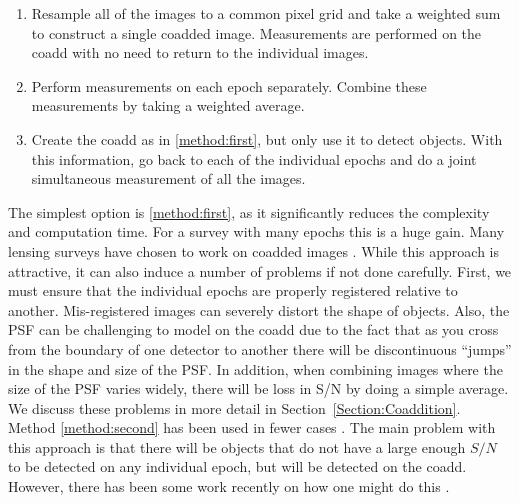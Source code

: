 \documentclass[fleqn,useAMS,usenatbib]{mnras}
\begin{document}
\begin{enumerate}
\item \label{method:first} Resample all of the images to a common pixel grid and 
take a weighted sum to construct a single coadded image.  Measurements are 
performed on the coadd with no need to return to the individual images.
\item \label{method:second} Perform measurements on each epoch separately.  
Combine these measurements by taking a weighted average.  
\item \label{method:third} Create the coadd as in \ref{method:first}, but only 
use it to detect objects.  With this information, go back to each of the 
individual epochs and do a joint simultaneous measurement of all the images.
\end{enumerate}

The simplest option is \ref{method:first}, as it significantly reduces the 
complexity and computation time.  For a survey with many epochs this is a huge 
gain.  Many lensing surveys have chosen to work on coadded images 
\citep{Hoekstra2006, Leauthaud2007, Hettersheidt2007, Lin2012,Melchior2015, 
Jee2016, Mandelbaum2018}.  While this approach is attractive, it can also induce 
a number of problems if not done carefully.  First, we must ensure that the 
individual epochs are properly registered relative to another.  Mis-registered 
images can severely distort the shape of objects. Also, the PSF can be 
challenging to model on the coadd due to the fact that as you cross from the 
boundary of one detector to another there will be discontinuous ``jumps'' in the 
shape and size of the PSF.  In addition, when combining images where the size 
of the PSF varies widely, there will be loss in S/N by doing a simple average.  
We discuss these problems in more detail in Section~\ref{Section:Coaddition}.
Method \ref{method:second} has been used in fewer cases \citep{Jarvis2003}.  
The main problem with this approach is that there will be objects that do not 
have a large enough $S/N$ to be detected on any individual epoch, but will be 
detected on the coadd.  However, there has been some work recently on how one 
might do this \citep{Budavari2017}.
\end{document}
